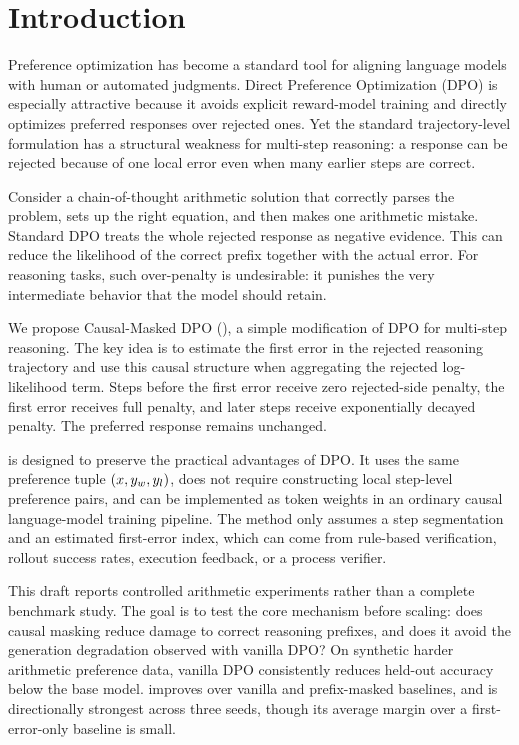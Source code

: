 \section{Introduction}

Preference optimization has become a standard tool for aligning language models with human or automated judgments. Direct Preference Optimization (DPO) \citep{rafailov2023direct} is especially attractive because it avoids explicit reward-model training and directly optimizes preferred responses over rejected ones. Yet the standard trajectory-level formulation has a structural weakness for multi-step reasoning: a response can be rejected because of one local error even when many earlier steps are correct.

Consider a chain-of-thought arithmetic solution that correctly parses the problem, sets up the right equation, and then makes one arithmetic mistake. Standard DPO treats the whole rejected response as negative evidence. This can reduce the likelihood of the correct prefix together with the actual error. For reasoning tasks, such over-penalty is undesirable: it punishes the very intermediate behavior that the model should retain.

We propose Causal-Masked DPO (\cmdpo), a simple modification of DPO for multi-step reasoning. The key idea is to estimate the first error in the rejected reasoning trajectory and use this causal structure when aggregating the rejected log-likelihood term. Steps before the first error receive zero rejected-side penalty, the first error receives full penalty, and later steps receive exponentially decayed penalty. The preferred response remains unchanged.

\cmdpo is designed to preserve the practical advantages of DPO. It uses the same preference tuple $(x,y_w,y_l)$, does not require constructing local step-level preference pairs, and can be implemented as token weights in an ordinary causal language-model training pipeline. The method only assumes a step segmentation and an estimated first-error index, which can come from rule-based verification, rollout success rates, execution feedback, or a process verifier.

This draft reports controlled arithmetic experiments rather than a complete benchmark study. The goal is to test the core mechanism before scaling: does causal masking reduce damage to correct reasoning prefixes, and does it avoid the generation degradation observed with vanilla DPO? On synthetic harder arithmetic preference data, vanilla DPO consistently reduces held-out accuracy below the base model. \cmdpo improves over vanilla and prefix-masked baselines, and is directionally strongest across three seeds, though its average margin over a first-error-only baseline is small.

